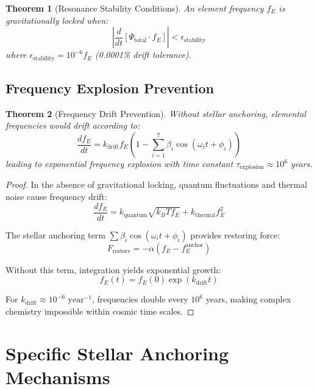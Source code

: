 \documentclass[12pt]{article}
\newtheorem{theorem}{Theorem}
\begin{document}
\begin{theorem}[Resonance Stability Conditions]
An element frequency $f_E$ is gravitationally locked when:
\begin{equation}
\left|\frac{d}{dt}\left[\Psi_{\text{total}} \cdot f_E\right]\right| < \epsilon_{\text{stability}}
\end{equation}
where $\epsilon_{\text{stability}} = 10^{-6} f_E$ (0.0001\% drift tolerance).
\end{theorem}

\subsection{Frequency Explosion Prevention}

\begin{theorem}[Frequency Drift Prevention]
Without stellar anchoring, elemental frequencies would drift according to:
\begin{equation}
\frac{df_E}{dt} = k_{\text{drift}} f_E \left(1 - \sum_{i=1}^{7} \beta_i \cos(\omega_i t + \phi_i)\right)
\end{equation}
leading to exponential frequency explosion with time constant $\tau_{\text{explosion}} \approx 10^6$ years.
\end{theorem}

\begin{proof}
In the absence of gravitational locking, quantum fluctuations and thermal noise cause frequency drift:
\begin{equation}
\frac{df_E}{dt} = k_{\text{quantum}} \sqrt{k_B T f_E} + k_{\text{thermal}} f_E^2
\end{equation}

The stellar anchoring term $\sum \beta_i \cos(\omega_i t + \phi_i)$ provides restoring force:
\begin{equation}
F_{\text{restore}} = -\alpha \left(f_E - f_E^{\text{anchor}}\right)
\end{equation}

Without this term, integration yields exponential growth:
\begin{equation}
f_E(t) = f_E(0) \exp(k_{\text{drift}} t)
\end{equation}

For $k_{\text{drift}} \approx 10^{-6} \text{ year}^{-1}$, frequencies double every $10^6$ years, making complex chemistry impossible within cosmic time scales.
\end{proof}

\section{Specific Stellar Anchoring Mechanisms}
\end{document}

